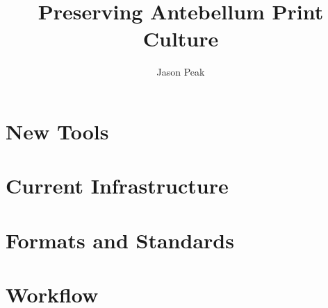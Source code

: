 \documentclass[oneside]{article}
\begin{document}
\title{Preserving Antebellum Print Culture}
\author{Jason Peak}


\def\projectname{Poe's Magazine World}
\def\apc{Antebellum Print Culture}
\def\bwj{\emph{The Broadway Journal}}
\def\slm{\emph{Southern Literary Messenger}}
\def\bgm{\emph{Burton's Gentleman's Magazine}}
\def\gm{\emph{Graham's Magazine}}
\def\maglist{\bgm, \bwj, \gm, and the \slm}

\def\needcite{[citation]}
\def\needswork{[needs much work for inclusion]}

%

%

%




%
\section{New Tools}

\section{Current Infrastructure}


\section{Formats and Standards}


\section{Workflow}

\end{document}
